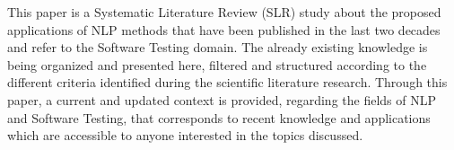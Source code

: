 This paper is a Systematic Literature Review (SLR) study about the proposed applications of NLP methods that have been published in the last two decades and refer to the Software Testing domain. 
The already existing knowledge is being organized and presented here, filtered and structured according to the different criteria identified during the scientific literature research. Through this paper, 
a current and updated context is provided, regarding the fields of NLP and Software Testing, that corresponds to recent knowledge and applications which are accessible to anyone interested in the topics discussed.